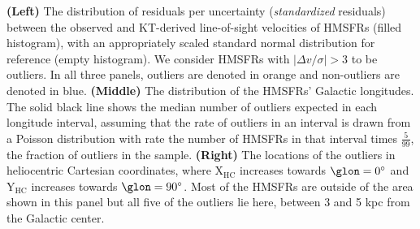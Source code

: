 \label{fig:outliers}
\textbf{(Left)} The distribution of residuals per uncertainty (\textit{standardized} residuals) between the observed and KT-derived line-of-sight velocities of HMSFRs (filled histogram), with an appropriately scaled standard normal distribution for reference (empty histogram). We consider HMSFRs with $\vert \Delta v / \sigma \vert > 3$ to be outliers. In all three panels, outliers are denoted in orange and non-outliers are denoted in blue. \textbf{(Middle)} The distribution of the HMSFRs' Galactic longitudes. 
The solid black line shows the median number of outliers expected in each longitude interval, assuming that the rate of outliers in an interval is drawn from a Poisson distribution with rate the number of HMSFRs in that interval times $\frac{5}{99}$, the fraction of outliers in the sample.
\textbf{(Right)} The locations of the outliers in heliocentric Cartesian coordinates, where $\mathrm{X_{HC}}$ increases towards $\glon=0^\circ$ and $\mathrm{Y_{HC}}$ increases towards $\glon=90^\circ$. Most of the HMSFRs are outside of the area shown in this panel but all five of the outliers lie here, between 3 and 5 kpc from the Galactic center.